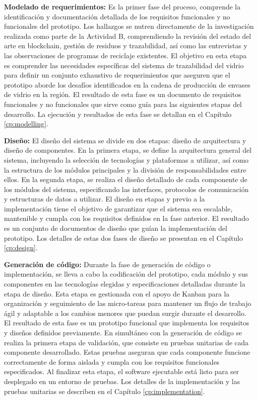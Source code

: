 \textbf{Modelado de requerimientos:}
Es la primer fase del proceso, comprende la identificación y documentación detallada de los requisitos funcionales y no funcionales del prototipo.
Los hallazgos se nutren directamente de la investigación realizada como parte de la Actividad B, comprendiendo la revisión del estado del arte en blockchain, gestión de residuos y trazabilidad, así como las entrevistas y las observaciones de programas de reciclaje existentes.
El objetivo en esta etapa es comprender las necesidades específicas del sistema de trazabilidad del vidrio para definir un conjunto exhaustivo de requerimientos que aseguren que el prototipo aborde los desafíos identificados en la cadena de producción de envases de vidrio en la región.
El resultado de esta fase es un documento de requisitos funcionales y no funcionales que sirve como guía para las siguientes etapas del desarrollo.
La ejecución y resultados de esta fase se detallan en el Capítulo \ref{cp:modelling}.

\textbf{Diseño:}
El diseño del sistema se divide en dos etapas: diseño de arquitectura y diseño de componentes.
En la primera etapa, se define la arquitectura general del sistema, incluyendo la selección de tecnologías y plataformas a utilizar, así como la estructura de los módulos principales y la división de responsabilidades entre ellos.
En la segunda etapa, se realiza el diseño detallado de cada componente de los módulos del sistema, especificando las interfaces, protocolos de comunicación y estructuras de datos a utilizar.
El diseño en etapas y previo a la implementación tiene el objetivo de garantizar que el sistema sea escalable, mantenible y cumpla con los requisitos definidos en la fase anterior.
El resultado es un conjunto de documentos de diseño que guían la implementación del prototipo.
Los detalles de estas dos fases de diseño se presentan en el Capítulo \ref{cp:design}.

\textbf{Generación de código:}
Durante la fase de generación de código o implementación, se lleva a cabo la codificación del prototipo, cada módulo y sus componentes en las tecnologías elegidas y especificaciones detalladas durante la etapa de diseño.
Esta etapa es gestionada con el apoyo de Kanban para la organización y seguimiento de las micro-tareas para mantener un flujo de trabajo ágil y adaptable a los cambios menores que puedan surgir durante el desarrollo.
El resultado de esta fase es un prototipo funcional que implementa los requisitos y diseños definidos previamente.
En simultáneo con la generación de código se realiza la primera etapa de validación, que consiste en pruebas unitarias de cada componente desarrollado.
Estas pruebas aseguran que cada componente funcione correctamente de forma aislada y cumpla con los requisitos funcionales especificados.
Al finalizar esta etapa, el software ejecutable está listo para ser desplegado en un entorno de pruebas.
Los detalles de la implementación y las pruebas unitarias se describen en el Capítulo \ref{cp:implementation}.

